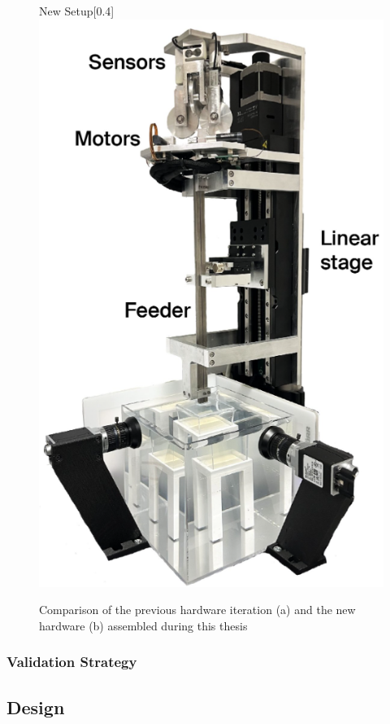 \begin{figure}[H]
\begin{subcaptionbox}{New Setup\label{fig:right}}[0.4\linewidth]
        {\includegraphics[width=\linewidth]{images/Hardware/insertionStrategy.PNG}}
    \end{subcaptionbox}
    \caption{Comparison of the previous hardware iteration (a) and the new hardware (b) assembled during this thesis}
    \label{fig:hardwarecompare}
\end{figure}


\subsubsection{Validation Strategy}


\subsection{Design}

